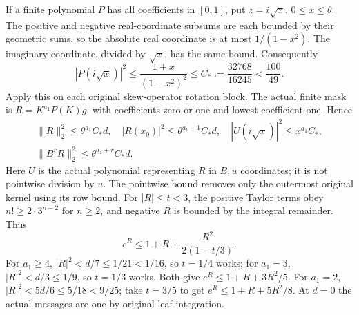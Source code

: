 If a finite polynomial $P$ has all coefficients in $[0,1]$, put
$z=i\sqrt x$, $0\le x\le\theta$.
The positive and negative real-coordinate subsums are each bounded
by their geometric sums, so the absolute real coordinate is at most
$1/(1-x^2)$. The imaginary coordinate, divided by $\sqrt x$, has
the same bound. Consequently
\begin{equation}\tag{L90.2.5}\label{eq:L90:mask}
|P(i\sqrt x)|^2\le\frac{1+x}{(1-x^2)^2}
\le C_*:=\frac{32768}{16245}<\frac{100}{49}.
\end{equation}
Apply this on each original skew-operator rotation block.
The actual finite mask is $R=K^{a_1}P(K)g$, with coefficients zero
or one and lowest coefficient one. Hence
\begin{equation}\tag{L90.2.6}\label{eq:L90:masknorm}
\begin{gathered}
\|R\|_2^2\le\theta^{a_1}C_*d,\quad |R(x_0)|^2\le\theta^{a_1-1}C_*d,\quad |U(i\sqrt x)|^2\le x^{a_1}C_*,\\
\|B^rR\|_2^2\le\theta^{a_1+r}C_*d.
\end{gathered}
\end{equation}
Here $U$ is the actual polynomial representing $R$ in $B,u$
coordinates; it is not pointwise division by $u$. The pointwise
bound removes only the outermost original kernel using its row bound.
For $|R|\le t<3$, the positive Taylor terms obey
$n!\ge2\cdot3^{n-2}$ for $n\ge2$, and negative $R$ is bounded by
the integral remainder. Thus
\[
e^R\le1+R+\frac{R^2}{2(1-t/3)}.
\]
For $a_1\ge4$, $|R|^2<d/7\le1/21<1/16$, so $t=1/4$ works;
for $a_1=3$, $|R|^2<d/3\le1/9$, so $t=1/3$ works.
Both give $e^R\le1+R+3R^2/5$.
For $a_1=2$, $|R|^2<5d/6\le5/18<9/25$; take $t=3/5$ to get
$e^R\le1+R+5R^2/8$.
At $d=0$ the actual messages are one by original leaf integration.
